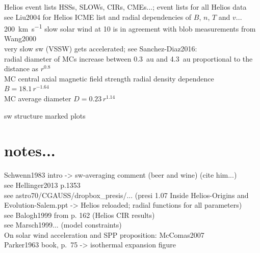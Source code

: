 Helios event lists HSSs, SLOWs, CIRs, CMEs...; event lists for all Helios data\\
see Liu2004 for Helios ICME list and radial dependencies of $B$, $n$, $T$ and $v$...\\

\SI{200}{\km\per\s} slow solar wind at \SI{10}{\Rs} is in agreement with blob measurements from Wang2000\\

very slow sw (VSSW) gets accelerated; see Sanchez-Diaz2016:\\


radial diameter of MCs increase between 0.3~au and 4.3~au proportional to the distance as $r^{0.8}$ \citep{Bothmer1998}\\
MC central axial magnetic field strength radial density dependence $B = 18.1\,r^{-1.64}$ \citet{Leitner2007}\\
MC average diameter $D = 0.23\,r^{1.14}$ \citet{Leitner2007}

sw structure marked plots\\


\section{notes...}

Schwenn1983 intro -> sw-averaging comment (beer and wine) (cite him...)\\
see Hellinger2013 p.1353\\
see astro70/CGAUSS/dropbox\_presis/... (presi 1.07 Inside Helios-Origins and Evolution-Salem.ppt -> Helios reloaded; radial functions for all parameters)\\
see Balogh1999 from p. 162 (Helios CIR results)\\
see Marsch1999... (model constraints)\\
On solar wind acceleration and SPP proposition: McComas2007\\
Parker1963 book, p.~75 -> isothermal expansion figure\\	%


